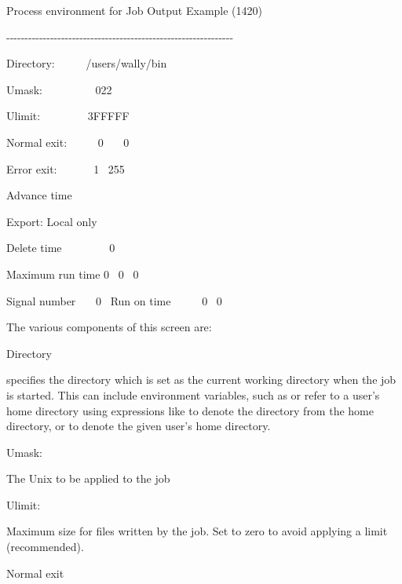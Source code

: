 \begin{exparasmall}

Process environment for Job {\textasciigrave}Output
Example{\textquotesingle} (1420)

{}-{}-{}-{}-{}-{}-{}-{}-{}-{}-{}-{}-{}-{}-{}-{}-{}-{}-{}-{}-{}-{}-{}-{}-{}-{}-{}-{}-{}-{}-{}-{}-{}-{}-{}-{}-{}-{}-{}-{}-{}-{}-{}-{}-{}-{}-{}-{}-{}-{}-{}-{}-{}-{}-{}-{}-{}-{}-{}-{}-{}-{}-

\bigskip


Directory: \ \ \ \ \ /users/wally/bin

\bigskip


Umask: \ \ \ \ \ \ \ \ \ 022

\bigskip


Ulimit: \ \ \ \ \ \ \ \ 3FFFFF

\bigskip


Normal exit: \ \ \ \ \ 0 \ \ \ 0

\bigskip


Error exit: \ \ \ \ \ \ 1 \ 255

\bigskip


Advance time

\bigskip


Export: Local only

\bigskip


Delete time \ \ \ \ \ \ \ \ 0

Maximum run time 0 \ 0 \ 0

Signal number \ \ \ 0 \ Run on time \ \ \ \ \ 0 \ 0

\end{exparasmall}

The various components of this screen are:

Directory

specifies the directory which is set as the current working directory
when the job is started. This can include environment variables, such
as  or refer to a user's
home directory using expressions like 
to denote the directory  from the home
directory, or  to denote the given
user's home directory.

Umask:

The Unix  to be applied to the job

Ulimit:

Maximum size for files written by the job. Set to zero to avoid applying a limit (recommended).

Normal exit


